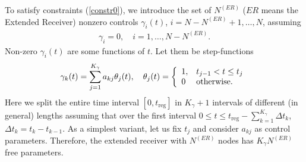 \documentclass[pra,preprint,showpacs]{revtex4-1}
\begin{document}
To satisfy constraints (\ref{constr0}), we introduce  the set of  $N^{(ER)}$ ($ER$ means the Extended Receiver) nonzero controls
$\gamma_i(t)$, $i=N-N^{(ER)}+1, \dots, N$,
assuming
\begin{eqnarray}
\gamma_i=0,\quad  i=1,\dots,N-N^{(ER)}.
\end{eqnarray}
Non-zero $\gamma_i(t)$ are some functions of $t$. Let them be step-functions~\cite{PP_2023}
\begin{eqnarray}\label{LF}
\gamma_k(t) = \sum_{j=1}^{K_\gamma} a_{kj} \theta_j(t),\quad  \theta_j(t) =\left\{\begin{array}{ll}
1, &t_{j-1} < t\le t_j\cr
0  & {\mbox{otherwise}}. \end{array}
\right.
\end{eqnarray}
Here we split the entire time interval
$[0,t_{\mathrm{reg}}]$
in $K_\gamma+1$ intervals of different (in general) lengths assuming that over the first interval $0\le t\le t_{\mathrm{reg}}- \sum_{k=1}^{K_\gamma} \Delta t_k$, $\Delta t_k = t_k - t_{k-1}$.
As a simplest variant, let us fix $t_j$ and consider  $a_{kj}$ as control parameters.
Therefore, the extended receiver with $N^{(ER)}$ nodes has $K_\gamma N^{(ER)}$ free parameters.
\iffalse
Then the evolution operator can be split into the set of non commuting (in general) operators $W_j$ of form
\begin{eqnarray}\label{VV}
W_j(t) &=& \left\{
\begin{array}{ll}
W_j(t) ,& t_{j-1} < t\le t_j\cr
1  & {\mbox{otherwise}}
\end{array}
\right..
\end{eqnarray}
\fi

\end{document}
